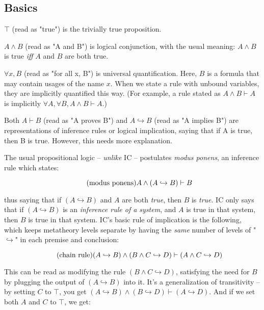 \documentclass{article}
\begin{document}
  \subsection{Basics}
  
  $\top$ (read as "true") is the trivially true proposition.
  
  $A \wedge B$ (read as "A and B") is logical conjunction, with the usual meaning: $A \wedge B$ is true \emph{iff} $A$ and $B$ are both true.

  \newcommand{\objto}{\hookrightarrow}
  $\forall x, B$ (read as "for all x, B") is universal quantification. Here, $B$ is a formula that may contain usages of the name $x$. When we state a rule with unbound variables, they are implicitly quantified this way. (For example, a rule stated as $A \wedge B \vdash A$ is implicitly $\forall A, \forall B, A \wedge B \vdash A$.)
  
  Both $A \vdash B$ (read as "A proves B") and $A \objto B$ (read as "A implies B") are representations of inference rules or logical implication, saying that if A is true, then B is true. However, this needs more explanation.
  
  The usual propositional logic – \emph{unlike} IC – postulates \emph{modus ponens}, an inference rule which states:
  
  \begin{equation*}
    \tag{modus ponens}
    A \wedge (A \objto B) \vdash B\\
  \end{equation*}
  
  thus saying that if $(A \objto B)$ and $A$ are both \emph{true}, then $B$ is \emph{true}. IC only says that if $(A \objto B)$ is an \emph{inference rule of a system}, and $A$ is true in that system, then $B$ is true in that system. IC's basic rule of implication is the following, which keeps metatheory levels separate by having the \emph{same} number of levels of "$\objto$" in each premise and conclusion:
  
  \begin{equation*}
    \tag{chain rule}
    (A \objto B) \wedge (B \wedge C \objto D) \vdash (A \wedge C \objto D)\\
  \end{equation*}
  
  This can be read as modifying the rule $(B \wedge C \objto D)$, satisfying the need for $B$ by plugging the output of $(A \objto B)$ into it. It's a generalization of transitivity – by setting $C$ to $\top$, you get $(A \objto B) \wedge (B \objto D) \vdash (A \objto D)$. And if we set both $A$ and $C$ to $\top$, we get:
  
\end{document}

